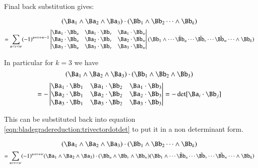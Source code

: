 Final back substitution gives:

\begin{equation*}
(\Ba_1 \wedge \Ba_{2} \wedge \Ba_3) \cdot (\Bb_1 \wedge \Bb_2 \cdots \wedge \Bb_k) 
\end{equation*}
\begin{equation}\label{eqn:bladegradereduction:trivectordotdet}
=
\sum_{u<v<w} (-1)^{u+v+w-1} 
\begin{vmatrix}
\Ba_1 \cdot \Bb_u & \Ba_1 \cdot \Bb_v & \Ba_1 \cdot \Bb_w \\
\Ba_2 \cdot \Bb_u & \Ba_2 \cdot \Bb_v & \Ba_2 \cdot \Bb_w \\
\Ba_3 \cdot \Bb_u & \Ba_3 \cdot \Bb_v & \Ba_3 \cdot \Bb_w \\
\end{vmatrix} 
(\Bb_1 \wedge \cdots \check \Bb_u \cdots \check{\Bb_v} \cdots \check{\Bb_w} \cdots \wedge \Bb_k)  \\
\end{equation}

In particular for $k=3$ we have
\begin{equation*}
(\Ba_1 \wedge \Ba_{2} \wedge \Ba_3) \cdot (\Bb_1 \wedge \Bb_2 \wedge \Bb_3) 
\end{equation*}
\begin{equation}\label{eqn:bladegradereduction:trivectordotdettri}
=
-\begin{vmatrix}
\Ba_1 \cdot \Bb_1 & \Ba_1 \cdot \Bb_2 & \Ba_1 \cdot \Bb_3 \\
\Ba_2 \cdot \Bb_1 & \Ba_2 \cdot \Bb_2 & \Ba_2 \cdot \Bb_3 \\
\Ba_3 \cdot \Bb_1 & \Ba_3 \cdot \Bb_2 & \Ba_3 \cdot \Bb_3 \\
\end{vmatrix} 
=
-\det[\Ba_i \cdot \Bb_j]
\end{equation}

This can be substituted back into equation \ref{eqn:bladegradereduction:trivectordotdet} to put it in a non determinant form.

\begin{equation*}
(\Ba_1 \wedge \Ba_{2} \wedge \Ba_3) \cdot (\Bb_1 \wedge \Bb_2 \cdots \wedge \Bb_k) 
\end{equation*}
\begin{equation}\label{eqn:bladegradereduction:trivectordotnondet}
=
\sum_{u<v<w} (-1)^{u+v+w} 
(\Ba_1 \wedge \Ba_{2} \wedge \Ba_3) \cdot (\Bb_u \wedge \Bb_v \wedge \Bb_w) 
(\Bb_1 \wedge \cdots \check \Bb_u \cdots \check{\Bb_v} \cdots \check{\Bb_w} \cdots \wedge \Bb_k)  \\
\end{equation}

